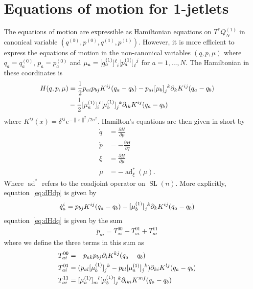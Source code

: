 \documentclass[12pt]{amsart}
\DeclareMathOperator{\SL}{SL}
\DeclareMathOperator{\ad}{ad}
\begin{document}
\section{Equations of motion for 1-jetlets}
\label{sec:eom}

The equations of motion are expressible as Hamiltonian
equations on $T^*Q_N^{(1)}$
in canonical variable $(q^{(0)},p^{(0)},q^{(1)},p^{(1)})$.
However, it is more efficient to express the equations of 
motion in the non-canonical variables $(q,p,\mu)$
where $q_a = q_a^{(0)}$, $p_a = p_a^{(0)}$ and $\mu_a = [q_a^{(1)}]\indices{^\ell_i} [p_a^{(1)}] \indices{_\ell^j}$ for $a = 1,\dots,N$.
The Hamiltonian in these coordinates is
\begin{align*}
  H(q,p,\mu) &=
  \frac{1}{2} p_{a i} p_{b j} K^{i j}(q_a - q_b) - p_{a i}
  [\mu_b]\indices{_{j}^{k}} \partial_k K^{i j}(q_a - q_b) \\
& -\frac{1}{2} [\mu_a^{(1)}]\indices{_{i}^l}
  [\mu_b^{(1)}]\indices{_j^k} \partial_{l k} K^{i j}(q_a - q_b)
\end{align*}
where $K^{i j}(x) = \delta^{i j} e^{- \| x \|^2 / 2 \sigma^2}$.
Hamilton's equations are then given in short by
\begin{align}
  \dot{q} &=  \frac{\partial H}{\partial p} \label{eq:dHdp} \\
  \dot{p} &= -\frac{\partial H}{\partial q} \label{eq:dHdq} \\
  \xi     &=  \frac{\partial H}{\partial \mu} \label{eq:dHdmu} \\
  \dot{\mu} &= - \ad^*_{ \xi } ( \mu ) . \label{eq:LiePoisson}
\end{align}
Where $\ad^*$ refers to the coadjoint operator on $\SL(n)$.
More explicitly, equation~\eqref{eq:dHdp} is given by
\begin{align*}
  \dot{q}_a^i = p_{b j} K^{i j}(q_a - q_b)
 -[\mu^{(1)}_b] \indices{_j^k} \partial_k K^{i j}(q_a - q_b)
\end{align*}
equation~\eqref{eq:dHdq} is given by the sum
\begin{align*}
  \dot{p}_{a i} = T^{00}_{a i} + T^{01}_{a i} + T^{11}_{a i}
\end{align*}
where we define the three terms in this sum as
\begin{align*}
  T^{00}_{a i} &= -p_{a k} p_{b j} \partial_{i} K^{k j}(q_a - q_b) \\
  T^{01}_{a i} &= (p_{a l}[\mu_b^{(1)}]\indices{_j^k}
                  -p_{b l}[\mu_a^{(1)}]\indices{_j^k}) \partial_{k i} K^{l j}(q_a - q_b) \\
  T^{11}_{a i} &= [\mu_a^{(1)}] \indices{_m^l} [\mu_b^{(1)}]\indices{_j^k}
                  \partial_{l k i} K^{m j}(q_a - q_b) \\
\end{align*}
\end{document}
